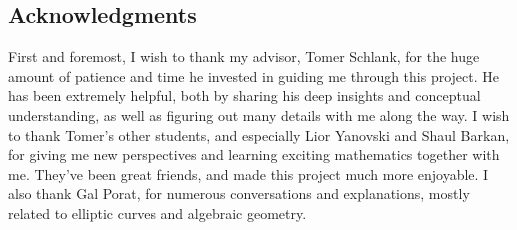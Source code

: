 \subsection*{Acknowledgments}

First and foremost, I wish to thank my advisor, Tomer Schlank, for the huge amount of patience and time he invested in guiding me through this project.
He has been extremely helpful, both by sharing his deep insights and conceptual understanding, as well as figuring out many details with me along the way.
I wish to thank Tomer's other students, and especially Lior Yanovski and Shaul Barkan, for giving me new perspectives and learning exciting mathematics together with me.
They've been great friends, and made this project much more enjoyable.
I also thank Gal Porat, for numerous conversations and explanations, mostly related to elliptic curves and algebraic geometry.